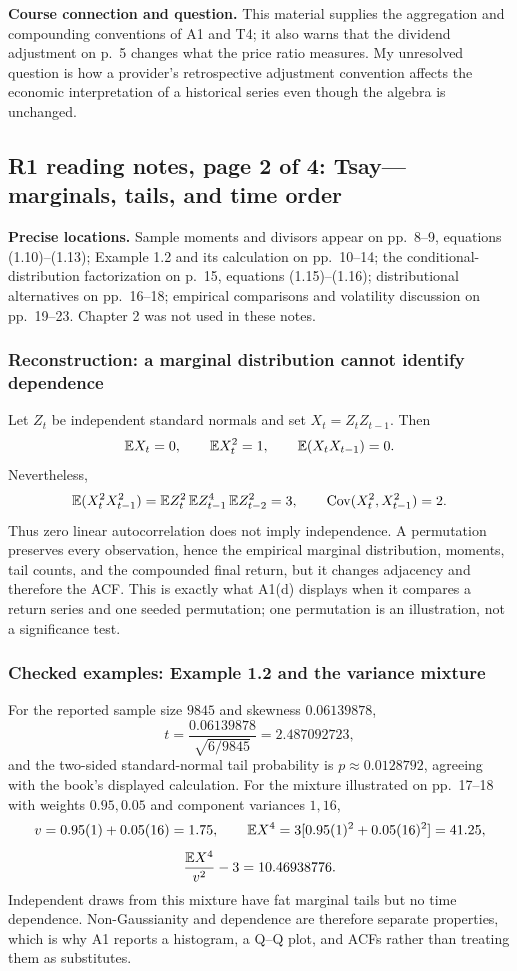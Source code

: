 \textbf{Course connection and question.} This material supplies the aggregation and compounding conventions of A1 and T4; it also warns that the dividend adjustment on p.~5 changes what the price ratio measures. My unresolved question is how a provider's retrospective adjustment convention affects the economic interpretation of a historical series even though the algebra is unchanged.
\clearpage

\subsection*{R1 reading notes, page 2 of 4: Tsay---marginals, tails, and time order}
\textbf{Precise locations.} Sample moments and divisors appear on pp.~8--9, equations (1.10)--(1.13); Example 1.2 and its calculation on pp.~10--14; the conditional-distribution factorization on p.~15, equations (1.15)--(1.16); distributional alternatives on pp.~16--18; empirical comparisons and volatility discussion on pp.~19--23. Chapter 2 was not used in these notes.

\subsubsection*{Reconstruction: a marginal distribution cannot identify dependence}
Let $Z_t$ be independent standard normals and set $X_t=Z_tZ_{t-1}$. Then
\[
 \mathbb E X_t=0,\qquad \mathbb E X_t^2=1,\qquad
 \mathbb E(X_tX_{t-1})=0.
\]
Nevertheless,
\[
 \mathbb E(X_t^2X_{t-1}^2)
 =\mathbb E Z_t^2\,\mathbb E Z_{t-1}^4\,\mathbb E Z_{t-2}^2=3,
 \qquad
 \operatorname{Cov}(X_t^2,X_{t-1}^2)=2.
\]
Thus zero linear autocorrelation does not imply independence. A permutation preserves every observation, hence the empirical marginal distribution, moments, tail counts, and the compounded final return, but it changes adjacency and therefore the ACF. This is exactly what A1(d) displays when it compares a return series and one seeded permutation; one permutation is an illustration, not a significance test.

\subsubsection*{Checked examples: Example 1.2 and the variance mixture}
For the reported sample size $9845$ and skewness $0.06139878$,
\[
 t=\frac{0.06139878}{\sqrt{6/9845}}=2.487092723,
\]
and the two-sided standard-normal tail probability is $p\approx0.0128792$, agreeing with the book's displayed calculation. For the mixture illustrated on pp.~17--18 with weights $0.95,0.05$ and component variances $1,16$,
\[
 v=0.95(1)+0.05(16)=1.75,\qquad
 \mathbb E X^4=3[0.95(1)^2+0.05(16)^2]=41.25,
\]
\[
 \frac{\mathbb E X^4}{v^2}-3=10.46938776.
\]
Independent draws from this mixture have fat marginal tails but no time dependence. Non-Gaussianity and dependence are therefore separate properties, which is why A1 reports a histogram, a Q--Q plot, and ACFs rather than treating them as substitutes.


